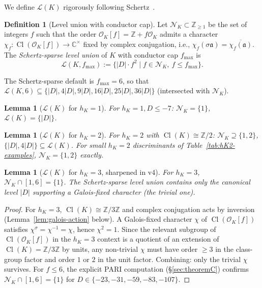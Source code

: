 \documentclass[11pt,a4paper]{amsart}
\newtheorem{lemma}[theorem]{Lemma}
\theoremstyle{definition}
\newtheorem{definition}[theorem]{Definition}
\DeclareMathOperator{\Cl}{Cl}
\newcommand{\Z}{\mathbb{Z}}
\newcommand{\C}{\mathbb{C}}
\newcommand{\OK}{\mathcal{O}_K}
\newcommand{\fa}{\mathfrak{a}}
\newcommand{\Lcal}{\mathcal{L}}
\newcommand{\Ncal}{\mathcal{N}}
\newcommand{\hK}{h_{K}}
\begin{document}
We define $\Lcal(K)$ rigorously following Schertz~\cite[\S6.3]{Schertz2010}.

\begin{definition}[Level union with conductor cap]\label{def:Lcal}
Let $\Ncal_K \subset \Z_{\ge 1}$ be the set of integers $f$ such that the order $\OK[f] = \Z + f\OK$ admits a character $\chi_f \colon \Cl(\OK[f]) \to \C^\times$ fixed by complex conjugation, i.e., $\chi_f(\sigma \fa) = \overline{\chi_f(\fa)}$. The \emph{Schertz-sparse level union} of $K$ with conductor cap $f_{\max}$ is
\[
\Lcal(K, f_{\max}) := \{|D| \cdot f^2 \mid f \in \Ncal_K, \ f \le f_{\max}\}.
\]
\end{definition}

The Schertz-sparse default is $f_{\max} = 6$, so that $\Lcal(K, 6) \subseteq \{|D|, 4|D|, 9|D|, 16|D|, 25|D|, 36|D|\}$ (intersected with $\Ncal_K$).

\begin{lemma}[$\Lcal(K)$ for $\hK = 1$]\label{lem:LcalhK1}
For $\hK = 1, D \le -7$: $\Ncal_K = \{1\}$, $\Lcal(K) = \{|D|\}$.
\end{lemma}

\begin{lemma}[$\Lcal(K)$ for $\hK = 2$]\label{lem:LcalhK2}
For $\hK = 2$ with $\Cl(K) \cong \Z/2$: $\Ncal_K \supseteq \{1, 2\}$, $\{|D|, 4|D|\} \subseteq \Lcal(K)$. For small $\hK = 2$ discriminants of Table~\ref{tab:hK2-examples}, $\Ncal_K = \{1, 2\}$ exactly.
\end{lemma}

\begin{lemma}[$\Lcal(K)$ for $\hK = 3$, sharpened in v4]\label{lem:LcalhK3-v4}
For $\hK = 3$, $\Ncal_K \cap [1, 6] = \{1\}$. The Schertz-sparse level union contains only the canonical level $|D|$ supporting a Galois-fixed character (the trivial one).
\end{lemma}

\begin{proof}
For $\hK = 3$, $\Cl(K) \cong \Z/3\Z$ and complex conjugation acts by inversion (Lemma~\ref{lem:galois-action} below). A Galois-fixed character $\chi$ of $\Cl(\OK[f])$ satisfies $\chi^\sigma = \chi^{-1} = \chi$, hence $\chi^2 = 1$. Since the relevant subgroup of $\Cl(\OK[f])$ in the $\hK = 3$ context is a quotient of an extension of $\Cl(K) = \Z/3\Z$ by units, any non-trivial $\chi$ must have order $\ge 3$ in the class-group factor and order $1$ or $2$ in the unit factor. Combining: only the trivial $\chi$ survives. For $f \le 6$, the explicit PARI computation (\S\ref{sec:theoremC}) confirms $\Ncal_K \cap [1, 6] = \{1\}$ for $D \in \{-23, -31, -59, -83, -107\}$.
\end{proof}
\end{document}
